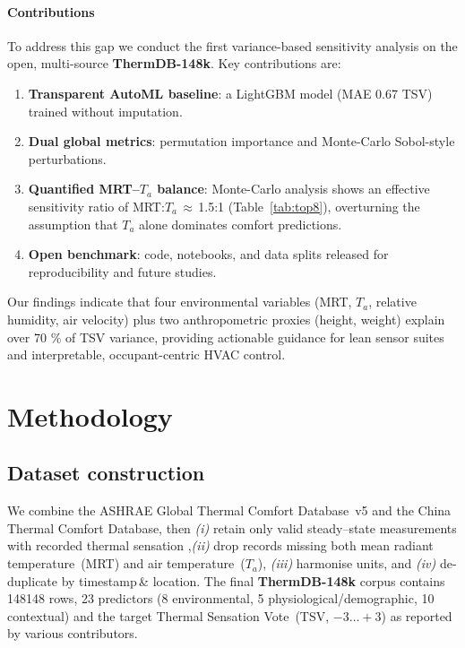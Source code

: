 \documentclass{article}
\theoremstyle{plain}
\theoremstyle{definition}
\theoremstyle{remark}
\begin{document}
\paragraph{Contributions}
To address this gap we conduct the first variance-based sensitivity analysis on the open, multi-source \textbf{ThermDB-148k}. 
Key contributions are:
\begin{enumerate}%
    \item \textbf{Transparent AutoML baseline}: a LightGBM model (MAE 0.67 TSV) trained without imputation.
    \item \textbf{Dual global metrics}: permutation importance and Monte-Carlo Sobol-style perturbations.
    \item \textbf{Quantified MRT–$T_a$ balance}: Monte-Carlo analysis shows an effective sensitivity ratio of MRT:\(T_{a}\)\,$\approx$\,1.5:1 (Table~\ref{tab:top8}), overturning the assumption that \(T_{a}\) alone dominates comfort predictions.
    \item \textbf{Open benchmark}: code, notebooks, and data splits released for reproducibility and future studies.
\end{enumerate}

Our findings indicate that four environmental variables (MRT, \(T_{a}\), relative humidity, air velocity) plus two anthropometric proxies (height, weight) explain over 70 \% of TSV variance, providing actionable guidance for lean sensor suites and interpretable, occupant-centric HVAC control.



\section{Methodology}\label{sec:methods}

\subsection{Dataset construction}\label{ssec:data}
We combine the ASHRAE Global Thermal Comfort Database~v5 and the China Thermal Comfort Database, then
\emph{(i)} retain only valid steady–state measurements with recorded thermal sensation 
,\emph{(ii)} drop records missing both mean radiant temperature~(MRT) and air temperature~($T_{a}$),  
\emph{(iii)} harmonise units, and  
\emph{(iv)} de-duplicate by timestamp\,\& location.  
The final \textbf{ThermDB-148k} corpus contains \num{148148} rows, \num{23} predictors (8 environmental, 5 physiological/demographic, 10 contextual) and the target Thermal Sensation Vote~(TSV, $-3\ldots +3$) as reported by various contributors.
\end{document}
